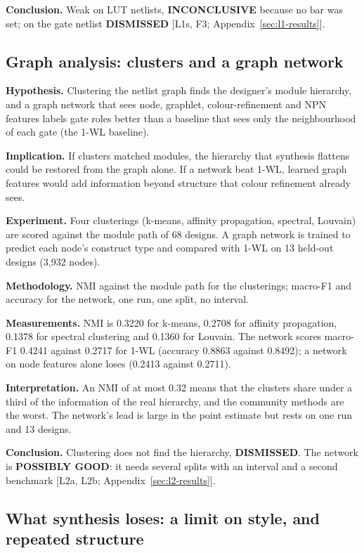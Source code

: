 \documentclass[conference]{IEEEtran}
\newcommand{\verdict}[1]{\textbf{\textsc{#1}}}
\newcommand{\hev}[1]{\par\smallskip\noindent\textbf{#1}}
\begin{document}
\hev{Conclusion.} Weak on LUT netlists, \verdict{INCONCLUSIVE} because no bar was set; on the gate netlist \verdict{DISMISSED} [L1s, F3; Appendix~\ref{sec:l1-results}].

\subsection{Graph analysis: clusters and a graph network}
\label{arg:ra4}

\hev{Hypothesis.} Clustering the netlist graph finds the designer's module hierarchy, and a graph network that sees node, graphlet, colour-refinement and NPN features labels gate roles better than a baseline that sees only the neighbourhood of each gate (the 1-WL baseline).

\hev{Implication.} If clusters matched modules, the hierarchy that synthesis flattens could be restored from the graph alone. If a network beat 1-WL, learned graph features would add information beyond structure that colour refinement already sees.

\hev{Experiment.} Four clusterings (k-means, affinity propagation, spectral, Louvain) are scored against the module path of 68 designs. A graph network is trained to predict each node's construct type and compared with 1-WL on 13 held-out designs (3,932 nodes).

\hev{Methodology.} NMI against the module path for the clusterings; macro-F1 and accuracy for the network, one run, one split, no interval.

\hev{Measurements.} NMI is 0.3220 for k-means, 0.2708 for affinity propagation, 0.1378 for spectral clustering and 0.1360 for Louvain. The network scores macro-F1 0.4241 against 0.2717 for 1-WL (accuracy 0.8863 against 0.8492); a network on node features alone loses (0.2413 against 0.2711).

\hev{Interpretation.} An NMI of at most 0.32 means that the clusters share under a third of the information of the real hierarchy, and the community methods are the worst. The network's lead is large in the point estimate but rests on one run and 13 designs.

\hev{Conclusion.} Clustering does not find the hierarchy, \verdict{DISMISSED}. The network is \verdict{POSSIBLY GOOD}: it needs several splits with an interval and a second benchmark [L2a, L2b; Appendix~\ref{sec:l2-results}].

\subsection{What synthesis loses: a limit on style, and repeated structure}
\label{arg:ra5}
\end{document}
